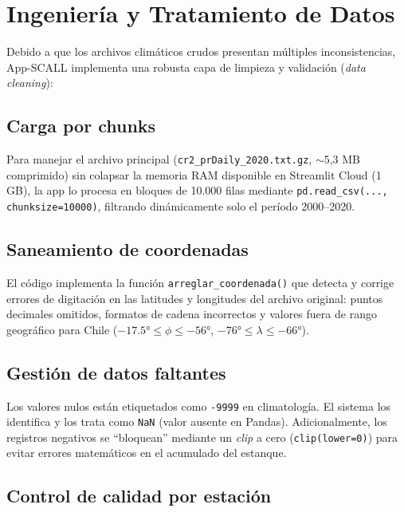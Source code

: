 \documentclass[12pt, a4paper]{article}
\begin{document}
\section{Ingeniería y Tratamiento de Datos}

Debido a que los archivos climáticos crudos presentan múltiples inconsistencias, App-SCALL implementa una robusta capa de limpieza y validación (\textit{data cleaning}):

\subsection{Carga por chunks}

Para manejar el archivo principal (\texttt{cr2\_prDaily\_2020.txt.gz}, $\sim$5,3 MB comprimido) sin colapsar la memoria RAM disponible en Streamlit Cloud (1 GB), la app lo procesa en bloques de 10.000 filas mediante \texttt{pd.read\_csv(..., chunksize=10000)}, filtrando dinámicamente solo el período 2000--2020.

\subsection{Saneamiento de coordenadas}

El código implementa la función \texttt{arreglar\_coordenada()} que detecta y corrige errores de digitación en las latitudes y longitudes del archivo original: puntos decimales omitidos, formatos de cadena incorrectos y valores fuera de rango geográfico para Chile ($-17.5° \leq \phi \leq -56°$, $-76° \leq \lambda \leq -66°$).

\subsection{Gestión de datos faltantes}

Los valores nulos están etiquetados como \texttt{-9999} en climatología. El sistema los identifica y los trata como \texttt{NaN} (valor ausente en Pandas). Adicionalmente, los registros negativos se ``bloquean'' mediante un \textit{clip} a cero (\texttt{clip(lower=0)}) para evitar errores matemáticos en el acumulado del estanque.

\subsection{Control de calidad por estación}
\end{document}

